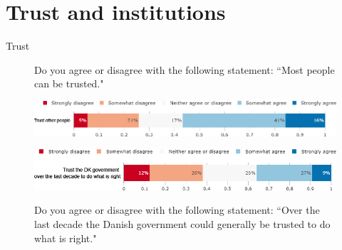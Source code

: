 \documentclass[aspectratio=169,9pt,dvipsnames]{beamer}
\begin{document}
\section{Trust and institutions}

\begin{frame}{Trust}%
\vspace{-.5cm}
\begin{figure}[h!]
\caption{Do you agree or disagree with the following statement: ``Most people can be trusted."}
\includegraphics[width=.8\textwidth]{../figures/DK/can_trust_people_DK.png} \\
\vspace{.1cm}
\caption{Do you agree or disagree with the following statement: ``Over the last decade the Danish government could generally be trusted to do what is right."}
\includegraphics[width=.8\textwidth]{../figures/DK/can_trust_govt_DK.png}\\
\end{figure}
\end{frame}
\end{document}
